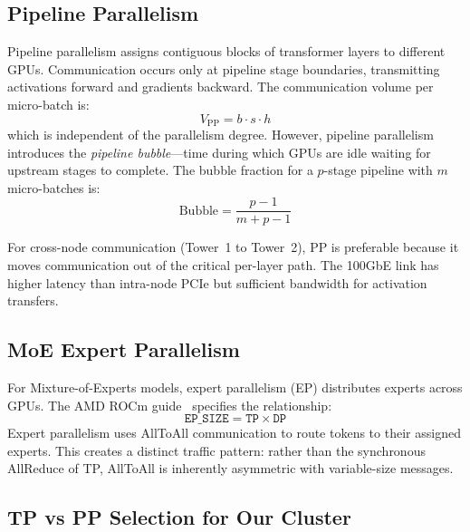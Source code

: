 \documentclass[11pt,letterpaper]{article}
\theoremstyle{definition}
\begin{document}
\subsection{Pipeline Parallelism}

Pipeline parallelism assigns contiguous blocks of transformer layers to different GPUs. Communication occurs only at pipeline stage boundaries, transmitting activations forward and gradients backward. The communication volume per micro-batch is:
\begin{equation}
    V_{\text{PP}} = b \cdot s \cdot h
\end{equation}
which is independent of the parallelism degree. However, pipeline parallelism introduces the \emph{pipeline bubble}---time during which GPUs are idle waiting for upstream stages to complete. The bubble fraction for a $p$-stage pipeline with $m$ micro-batches is:
\begin{equation}
    \text{Bubble} = \frac{p - 1}{m + p - 1}
\end{equation}

For cross-node communication (Tower~1 to Tower~2), PP is preferable because it moves communication out of the critical per-layer path. The 100GbE link has higher latency than intra-node PCIe but sufficient bandwidth for activation transfers.

\subsection{MoE Expert Parallelism}

For Mixture-of-Experts models, expert parallelism (EP) distributes experts across GPUs. The AMD ROCm guide~\cite{amd-moe-guide} specifies the relationship:
\begin{equation}
    \texttt{EP\_SIZE} = \texttt{TP} \times \texttt{DP}
\end{equation}
Expert parallelism uses AllToAll communication to route tokens to their assigned experts. This creates a distinct traffic pattern: rather than the synchronous AllReduce of TP, AllToAll is inherently asymmetric with variable-size messages.

\subsection{TP vs PP Selection for Our Cluster}
\end{document}
